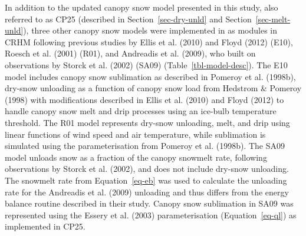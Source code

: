\documentclass[
  letterpaper,
]{tex/uofsthesis-cs}
\begin{document}
In addition to the updated canopy snow model presented in this study,
also referred to as CP25 (described in Section~\ref{sec-dry-unld} and
Section~\ref{sec-melt-unld}), three other canopy snow models were
implemented in as modules in CRHM following previous studies by Ellis et
al. (2010) and Floyd (2012) (E10), Roesch et al. (2001) (R01), and
Andreadis et al. (2009), who built on observations by Storck et al.
(2002) (SA09) (Table~\ref{tbl-model-desc}). The E10 model includes
canopy snow sublimation as described in Pomeroy et al. (1998b), dry-snow
unloading as a function of canopy snow load from Hedstrom \& Pomeroy
(1998) with modifications described in Ellis et al. (2010) and Floyd
(2012) to handle canopy snow melt and drip processes using an ice-bulb
temperature threshold. The R01 model represents dry-snow unloading,
melt, and drip using linear functions of wind speed and air temperature,
while sublimation is simulated using the parameterisation from Pomeroy
et al. (1998b). The SA09 model unloads snow as a fraction of the canopy
snowmelt rate, following observations by Storck et al. (2002), and does
not include dry-snow unloading. The snowmelt rate from
Equation~\ref{eq-eb} was used to calculate the unloading rate for the
Andreadis et al. (2009) unloading and thus differs from the energy
balance routine described in their study. Canopy snow sublimation in
SA09 was represented using the Essery et al. (2003) parameterisation
(Equation~\ref{eq-ql}) as implemented in CP25.
\end{document}
